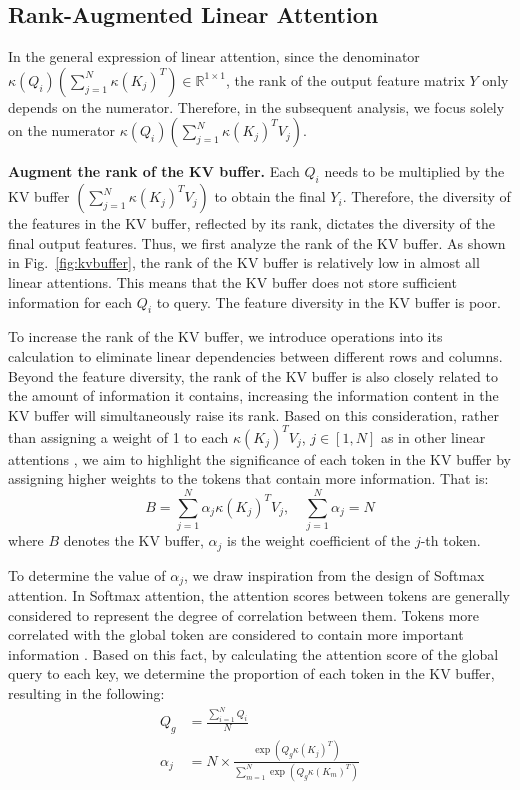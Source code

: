 \documentclass[10pt,twocolumn,letterpaper]{article}
\begin{document}
\subsection{Rank-Augmented Linear Attention}

In the general expression of linear attention, since the denominator $\kappa(Q_i)\left(\sum_{j=1}^{N} \kappa(K_j)^T\right) \in \mathbb{R}^{1 \times 1}$, the rank of the output feature matrix $Y$ only depends on the numerator. Therefore, in the subsequent analysis, we focus solely on the numerator $\kappa(Q_i)\left(\sum_{j=1}^{N} \kappa(K_j)^T V_j\right)$.

\textbf{Augment the rank of the KV buffer.} Each $Q_i$ needs to be multiplied by the KV buffer $\left(\sum_{j=1}^{N} \kappa(K_j)^T V_j\right)$ to obtain the final $Y_i$. Therefore, the diversity of the features in the KV buffer, reflected by its rank, dictates the diversity of the final output features. Thus, we first analyze the rank of the KV buffer. As shown in Fig.~\ref{fig:kvbuffer}, the rank of the KV buffer is relatively low in almost all linear attentions. This means that the KV buffer does not store sufficient information for each $Q_i$ to query. The feature diversity in the KV buffer is poor.

To increase the rank of the KV buffer, we introduce operations into its calculation to eliminate linear dependencies between different rows and columns. Beyond the feature diversity, the rank of the KV buffer is also closely related to the amount of information it contains, increasing the information content in the KV buffer will simultaneously raise its rank. Based on this consideration, rather than assigning a weight of 1 to each $\kappa(K_j)^T V_j$, $j \in [1, N]$ as in other linear attentions \cite{han2023flatten,shen2021efficient}, we aim to highlight the significance of each token in the KV buffer by assigning higher weights to the tokens that contain more information. That is:
\begin{equation}
B = \sum_{j=1}^{N} \alpha_j \kappa(K_j)^T V_j, \quad \sum_{j=1}^{N} \alpha_j = N
\label{eq:kvbuffer}
\end{equation}
where $B$ denotes the KV buffer, $\alpha_j$ is the weight coefficient of the $j$-th token.

To determine the value of $\alpha_j$, we draw inspiration from the design of Softmax attention. In Softmax attention, the attention scores between tokens are generally considered to represent the degree of correlation between them. Tokens more correlated with the global token are considered to contain more important information \cite{liang2022not}. Based on this fact, by calculating the attention score of the global query to each key, we determine the proportion of each token in the KV buffer, resulting in the following:
\begin{equation}
\begin{aligned}
Q_g &= \frac{\sum_{i=1}^{N} Q_i}{N} \\
\alpha_j &= N \times \frac{\exp(Q_g \kappa(K_j)^T)}{\sum_{m=1}^{N} \exp(Q_g \kappa(K_m)^T)}
\end{aligned}
\label{eq:alpha}
\end{equation}
\end{document}
